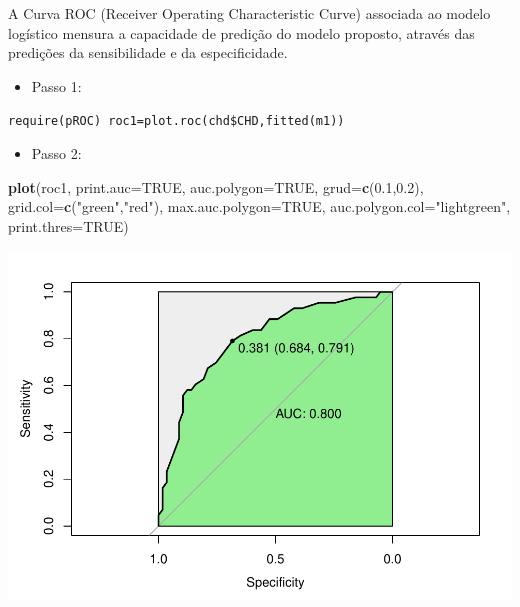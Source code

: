 \documentclass[12pt,brazil,]{book}
\newenvironment{Shaded}{\begin{snugshade}}{\end{snugshade}}
\newcommand{\DataTypeTok}[1]{\textcolor[rgb]{0.13,0.29,0.53}{#1}}
\newcommand{\FloatTok}[1]{\textcolor[rgb]{0.00,0.00,0.81}{#1}}
\newcommand{\KeywordTok}[1]{\textcolor[rgb]{0.13,0.29,0.53}{\textbf{#1}}}
\newcommand{\NormalTok}[1]{#1}
\newcommand{\OtherTok}[1]{\textcolor[rgb]{0.56,0.35,0.01}{#1}}
\newcommand{\StringTok}[1]{\textcolor[rgb]{0.31,0.60,0.02}{#1}}
\providecommand{\tightlist}{%
  \setlength{\itemsep}{0pt}\setlength{\parskip}{0pt}}
\begin{document}
A Curva ROC (Receiver Operating Characteristic Curve) associada ao
modelo logístico mensura a capacidade de predição do modelo proposto,
através das predições da sensibilidade e da especificidade.

\begin{itemize}
\tightlist
\item
  Passo 1:
\end{itemize}

\texttt{require(pROC)\ roc1=plot.roc(chd\$CHD,fitted(m1))}

\begin{itemize}
\tightlist
\item
  Passo 2:
\end{itemize}

\begin{Shaded}
\begin{Highlighting}[]
\KeywordTok{plot}\NormalTok{(roc1,}
     \DataTypeTok{print.auc=}\OtherTok{TRUE}\NormalTok{, }
     \DataTypeTok{auc.polygon=}\OtherTok{TRUE}\NormalTok{, }
     \DataTypeTok{grud=}\KeywordTok{c}\NormalTok{(}\FloatTok{0.1}\NormalTok{,}\FloatTok{0.2}\NormalTok{),}
     \DataTypeTok{grid.col=}\KeywordTok{c}\NormalTok{(}\StringTok{"green"}\NormalTok{,}\StringTok{"red"}\NormalTok{), }
     \DataTypeTok{max.auc.polygon=}\OtherTok{TRUE}\NormalTok{, }
     \DataTypeTok{auc.polygon.col=}\StringTok{"lightgreen"}\NormalTok{, }
     \DataTypeTok{print.thres=}\OtherTok{TRUE}\NormalTok{)}
\end{Highlighting}
\end{Shaded}

\includegraphics{05-RegLogist_files/figure-latex/unnamed-chunk-11-1.pdf}
\end{document}
